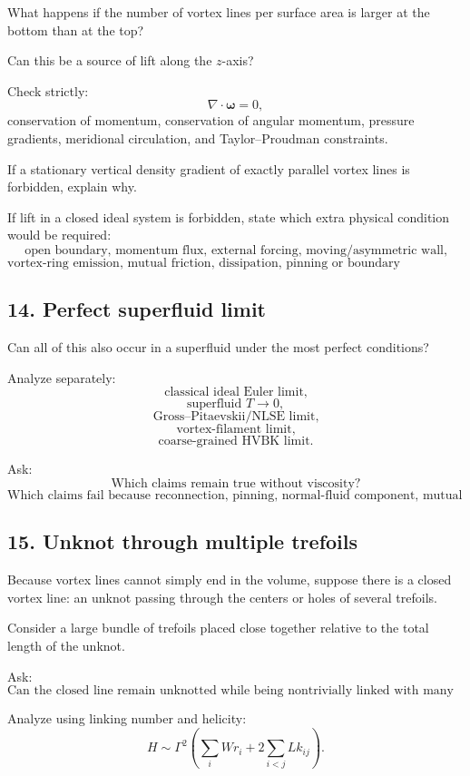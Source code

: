 \documentclass[11pt,a4paper]{article}
\begin{document}
What happens if the number of vortex lines per surface area is larger at the bottom than at the top?

Can this be a source of lift along the \(z\)-axis?

Check strictly:
\[
\nabla\cdot\boldsymbol{\omega}=0,
\]
conservation of momentum, conservation of angular momentum, pressure gradients, meridional circulation, and Taylor--Proudman constraints.

If a stationary vertical density gradient of exactly parallel vortex lines is forbidden, explain why.

If lift in a closed ideal system is forbidden, state which extra physical condition would be required:
\[
\text{open boundary, momentum flux, external forcing, moving/asymmetric wall,}
\]
\[
\text{vortex-ring emission, mutual friction, dissipation, pinning or boundary interaction.}
\]

\subsection{14. Perfect superfluid limit}

Can all of this also occur in a superfluid under the most perfect conditions?

Analyze separately:
\[
\text{classical ideal Euler limit,}
\]
\[
\text{superfluid }T\rightarrow0,
\]
\[
\text{Gross--Pitaevskii/NLSE limit,}
\]
\[
\text{vortex-filament limit,}
\]
\[
\text{coarse-grained HVBK limit.}
\]

Ask:
\[
\text{Which claims remain true without viscosity?}
\]
\[
\text{Which claims fail because reconnection, pinning, normal-fluid component, mutual friction, boundary forcing, or quantization is required?}
\]

\subsection{15. Unknot through multiple trefoils}

Because vortex lines cannot simply end in the volume, suppose there is a closed vortex line: an unknot passing through the centers or holes of several trefoils.

Consider a large bundle of trefoils placed close together relative to the total length of the unknot.

Ask:
\[
\text{Can the closed line remain unknotted while being nontrivially linked with many trefoils?}
\]

Analyze using linking number and helicity:
\[
H
\sim
\Gamma^2
\left(
\sum_i Wr_i
+
2\sum_{i<j}Lk_{ij}
\right).
\]
\end{document}
